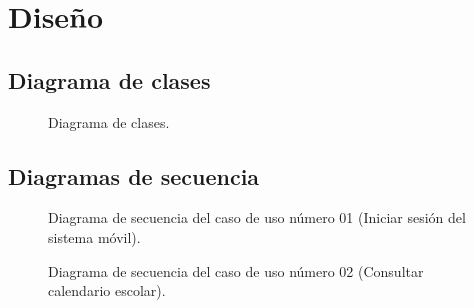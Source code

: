 \chapter{Diseño}	

\section{Diagrama de clases}

\begin{figure}[htbp!]
	\begin{center}
		\caption{Diagrama de clases.}
		\label{fig:Diagrama de clases}
	\end{center}
\end{figure}

\section{Diagramas de secuencia}

\begin{figure}[htbp!]
	\begin{center}
		\caption{Diagrama de secuencia del caso de uso número 01 (Iniciar sesión del sistema móvil).}
		\label{fig:Diagrama de secuencia CU-01}
	\end{center}
\end{figure}

\begin{figure}[htbp!]
	\begin{center}
		\caption{Diagrama de secuencia del caso de uso número 02 (Consultar calendario escolar).}
		\label{fig:Diagrama de secuencia CU-02}
	\end{center}
\end{figure}

